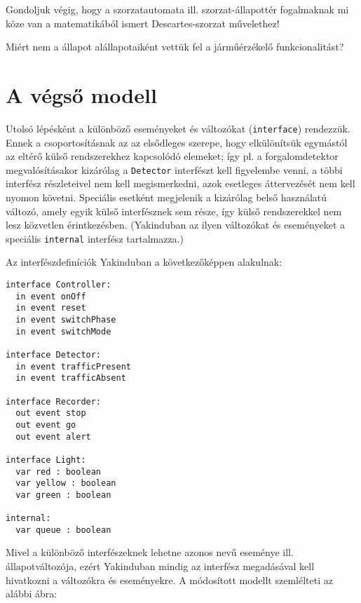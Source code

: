 \begin{feladat}
Gondoljuk végig, hogy a szorzatautomata ill. szorzat-állapottér fogalmaknak mi köze van a matematikából ismert Descartes-szorzat művelethez!
\end{feladat}

\begin{feladat}
Miért nem a  állapot alállapotaiként vettük fel a járműérzékelő funkcionalitást?
\end{feladat}

\section{A végső modell}

Utolsó lépésként a különböző eseményeket és változókat  (\lstinline{interface}) rendezzük. Ennek a csoportosításnak az az elsődleges szerepe, hogy elkülönítsük egymástól az eltérő külső rendszerekhez kapcsolódó elemeket; így pl. a forgalomdetektor megvalósításakor kizárólag a \lstinline{Detector} interfészt kell figyelembe venni, a többi interfész részleteivel nem kell megismerkedni, azok esetleges áttervezését nem kell nyomon követni. Speciális esetként megjelenik a kizárólag belső használatú  változó, amely egyik külső interfésznek sem része, így külső rendszerekkel nem lesz közvetlen érintkezésben. (Yakinduban az ilyen változókat és eseményeket a speciális \lstinline{internal} interfész tartalmazza.)

Az interfészdefiníciók Yakinduban a következőképpen alakulnak:

\begin{lstlisting}
interface Controller:
  in event onOff
  in event reset
  in event switchPhase
  in event switchMode

interface Detector:
  in event trafficPresent
  in event trafficAbsent

interface Recorder:
  out event stop
  out event go
  out event alert

interface Light:
  var red : boolean
  var yellow : boolean
  var green : boolean

internal:
  var queue : boolean
\end{lstlisting}

Mivel a különböző interfészeknek lehetne azonos nevű eseménye ill. állapotváltozója, ezért Yakinduban mindig az interfész megadásával kell hivatkozni a változókra és eseményekre. A módosított modellt szemlélteti az alábbi ábra:

